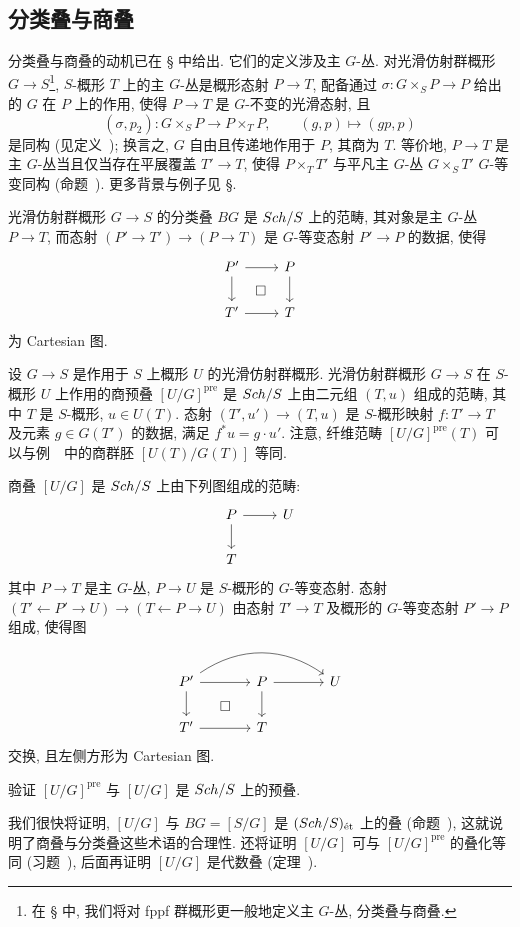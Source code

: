\subsection{分类叠与商叠}\label{src:3.4.3-subsection}
分类叠与商叠的动机已在 \S{} 中给出. 它们的定义涉及主 $G$-丛. 对光滑仿射群概形 $G\to S$\footnote{在 \S{} 中, 我们将对 fppf 群概形更一般地定义主 $G$-丛, 分类叠与商叠.}, $S$-概形 $T$ 上的主 $G$-丛是概形态射 $P\to T$, 配备通过 $\sigma:G\times_S P\to P$ 给出的 $G$ 在 $P$ 上的作用, 使得 $P\to T$ 是 $G$-不变的光滑态射, 且
\[
(\sigma,p_2):G\times_S P\longrightarrow P\times_T P,
\qquad(g,p)\longmapsto(gp,p)
\]
是同构 (见定义~); 换言之, $G$ 自由且传递地作用于 $P$, 其商为 $T$.
等价地, $P\to T$ 是主 $G$-丛当且仅当存在平展覆盖 $T'\to T$, 使得 $P\times_T T'$ 与平凡主 $G$-丛 $G\times_S T'$ $G$-等变同构 (命题~). 更多背景与例子见 \S{}.
\begin{definition}[分类叠]\label{src:3.4.14}
光滑仿射群概形 $G\to S$ 的分类叠 $BG$ 是 $Sch/S$ 上的范畴, 其对象是主 $G$-丛 $P\to T$, 而态射 $(P'\to T')\to(P\to T)$ 是 $G$-等变态射 $P'\to P$ 的数据, 使得
\[
\begin{tikzcd}
P'\arrow[r]\arrow[d]\arrow[dr,phantom,"\square"]&P\arrow[d]\\
T'\arrow[r]&T
\end{tikzcd}
\]
为 Cartesian 图.
\end{definition}
\begin{definition}[商预叠与商叠]\label{src:3.4.15}
设 $G\to S$ 是作用于 $S$ 上概形 $U$ 的光滑仿射群概形. 光滑仿射群概形 $G\to S$ 在 $S$-概形 $U$ 上作用的商预叠 $[U/G]^{\mathrm{pre}}$ 是 $Sch/S$ 上由二元组 $(T,u)$ 组成的范畴, 其中 $T$ 是 $S$-概形, $u\in U(T)$. 态射 $(T',u')\to(T,u)$ 是 $S$-概形映射 $f:T'\to T$ 及元素 $g\in G(T')$ 的数据, 满足 $f^*u=g\cdot u'$. 注意, 纤维范畴 $[U/G]^{\mathrm{pre}}(T)$ 可以与例~~中的商群胚 $[U(T)/G(T)]$ 等同.

商叠 $[U/G]$ 是 $Sch/S$ 上由下列图组成的范畴:
\[
\begin{tikzcd}
P\arrow[r]\arrow[d]&U\\
T&
\end{tikzcd}
\]
其中 $P\to T$ 是主 $G$-丛, $P\to U$ 是 $S$-概形的 $G$-等变态射.
态射 $(T'\leftarrow P'\to U)\to(T\leftarrow P\to U)$ 由态射 $T'\to T$ 及概形的 $G$-等变态射 $P'\to P$ 组成, 使得图
\[
\begin{tikzcd}[column sep=large]
P'\arrow[r]\arrow[rr,bend left=35]\arrow[d]\arrow[dr,phantom,"\square"]&
P\arrow[r]\arrow[d]&U\\
T'\arrow[r]&T&
\end{tikzcd}
\]
交换, 且左侧方形为 Cartesian 图.
\end{definition}
\begin{exercise}[简单]\label{src:3.4.16}
验证 $[U/G]^{\mathrm{pre}}$ 与 $[U/G]$ 是 $Sch/S$ 上的预叠.
\end{exercise}
我们很快将证明, $[U/G]$ 与 $BG=[S/G]$ 是 $(Sch/S)_{\text{ét}}$ 上的叠 (命题~), 这就说明了商叠与分类叠这些术语的合理性. 还将证明 $[U/G]$ 可与 $[U/G]^{\mathrm{pre}}$ 的叠化等同 (习题~), 后面再证明 $[U/G]$ 是代数叠 (定理~).

